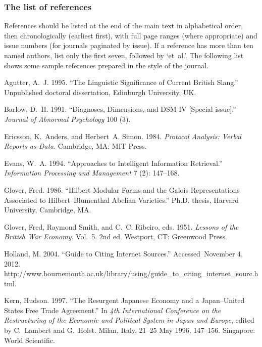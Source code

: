 \documentclass{tPRS2e}
\begin{document}
\subsubsection{The list of references}

References should be listed at the end of the main text in alphabetical order, then chronologically (earliest first), with full page ranges (where appropriate) and issue numbers (for journals paginated by issue). If a reference has more than ten named authors, list only the first seven, followed by `et~al.'. The following list shows some sample references prepared in the style of the journal.

\begin{thebibliography}{99}

Agutter, A.~J. 1995. ``The Linguistic Significance of Current {B}ritish
 Slang.'' Unpublished doctoral dissertation, Edinburgh University, UK.

Barlow, D.~H. 1991. ``Diagnoses, Dimensions, and {DSM-IV} [Special issue].''
 \emph{Journal of Abnormal Psychology} 100 (3).

Ericsson, K.~Anders, and Herbert~A. Simon. 1984. \emph{Protocol Analysis:
 Verbal Reports as Data}. Cambridge, MA: MIT Press.

Evans, W.~A. 1994. ``Approaches to Intelligent Information Retrieval.''
 \emph{Information Processing and Management} 7 (2): 147--168.

Glover, Fred. 1986. ``Hilbert Modular Forms and the {G}alois Representations
 Associated to {H}ilbert--{B}lumenthal Abelian Varieties.'' Ph.D. thesis,
 Harvard University, Cambridge, MA.

Glover, Fred, Raymond Smith, and C.~C. Ribeiro, eds. 1951. \emph{Lessons of the {B}ritish War
 Economy}. Vol.~5. 2nd ed. Westport, CT: Greenwood Press.

Holland, M. 2004. ``Guide to Citing Internet Sources.'' Accessed~November 4,
 2012.
 http://www.bournemouth.ac.uk/library/using/guide\_to\_citing\_internet\_sourc.html.

Kern, Hudson. 1997. ``The Resurgent {J}apanese Economy and a {J}apan--{U}nited
 {S}tates Free Trade Agreement.'' In \emph{4th International Conference on the
 Restructuring of the Economic and Political System in {J}apan and {E}urope},
 edited by C.~Lambert and G.~Holst. Milan, Italy, 21--25 May 1996, 147--156.
 Singapore: World Scientific.


\end{thebibliography}
\end{document}
